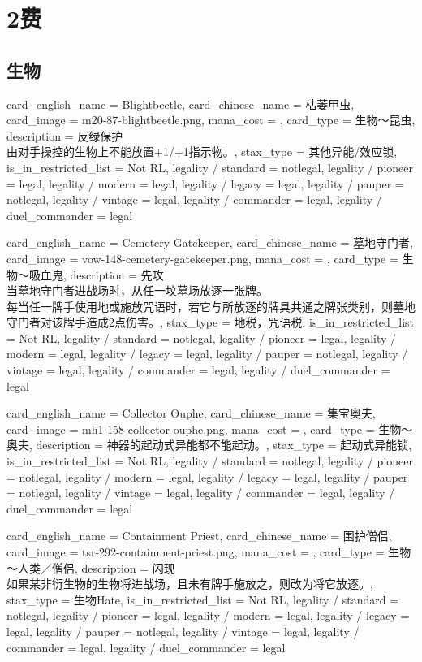 \documentclass[lang = cn, color = black, 10pt]{AllThatStax}
\begin{document}
\chapter{2费}

\section{生物}

\card
{
	card_english_name = {Blightbeetle},
	card_chinese_name = {枯萎甲虫},
	card_image = m20-87-blightbeetle.png,
	mana_cost = ,
	card_type = 生物～昆虫,
	description = {反绿保护\\
由对手操控的生物上不能放置+1/+1指示物。},
	stax_type = 其他异能/效应锁,
	is_in_restricted_list = Not RL,
	legality / standard = notlegal,
	legality / pioneer = legal,
	legality / modern = legal,
	legality / legacy = legal,
	legality / pauper = notlegal,
	legality / vintage = legal,
	legality / commander = legal,
	legality / duel_commander = legal
}

\card
{
	card_english_name = {Cemetery Gatekeeper},
	card_chinese_name = {墓地守门者},
	card_image = vow-148-cemetery-gatekeeper.png,
	mana_cost = ,
	card_type = 生物～吸血鬼,
	description = {先攻\\
当墓地守门者进战场时，从任一坟墓场放逐一张牌。\\
每当任一牌手使用地或施放咒语时，若它与所放逐的牌具共通之牌张类别，则墓地守门者对该牌手造成2点伤害。},
	stax_type = 地税，咒语税,
	is_in_restricted_list = Not RL,
	legality / standard = notlegal,
	legality / pioneer = legal,
	legality / modern = legal,
	legality / legacy = legal,
	legality / pauper = notlegal,
	legality / vintage = legal,
	legality / commander = legal,
	legality / duel_commander = legal
}

\card
{
	card_english_name = {Collector Ouphe},
	card_chinese_name = {集宝奥夫},
	card_image = mh1-158-collector-ouphe.png,
	mana_cost = ,
	card_type = 生物～奥夫,
	description = {神器的起动式异能都不能起动。},
	stax_type = 起动式异能锁,
	is_in_restricted_list = Not RL,
	legality / standard = notlegal,
	legality / pioneer = notlegal,
	legality / modern = legal,
	legality / legacy = legal,
	legality / pauper = notlegal,
	legality / vintage = legal,
	legality / commander = legal,
	legality / duel_commander = legal
}

\card
{
	card_english_name = {Containment Priest},
	card_chinese_name = {围护僧侣},
	card_image = tsr-292-containment-priest.png,
	mana_cost = ,
	card_type = 生物～人类／僧侣,
	description = {闪现\\
如果某非衍生物的生物将进战场，且未有牌手施放之，则改为将它放逐。},
	stax_type = 生物Hate,
	is_in_restricted_list = Not RL,
	legality / standard = notlegal,
	legality / pioneer = legal,
	legality / modern = legal,
	legality / legacy = legal,
	legality / pauper = notlegal,
	legality / vintage = legal,
	legality / commander = legal,
	legality / duel_commander = legal
}
\end{document}
